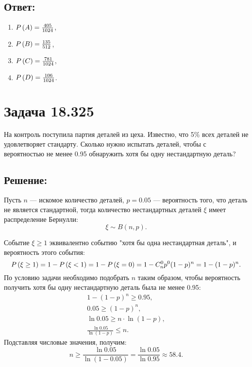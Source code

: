 \subsection*{Ответ:}
\begin{enumerate}
    \item $P \left ( A \right ) = \frac{405}{1024}$,
    \item $P \left ( B \right ) = \frac{135}{512}$,
    \item $P \left ( C \right ) = \frac{781}{1024}$,
    \item $P \left ( D \right ) = \frac{106}{1024}$.
\end{enumerate}

\section*{Задача 18.325}

На контроль поступила партия деталей из цеха. Известно, что 5\% всех деталей не удовлетворяет стандарту. Сколько нужно испытать деталей, чтобы с вероятностью не менее 0.95
обнаружить хотя бы одну нестандартную деталь?

\subsection*{Решение:}

Пусть $n$ --- искомое количество деталей, $p=0.05$ --- вероятность того, что деталь не является стандартной, тогда количество нестандартных деталей $\xi$ имеет распределение
Бернулли:
\begin{equation}
    \xi \sim B \left ( n, p \right ).
\end{equation}

Событие $\xi \ge 1$ эквивалентно событию "хотя бы одна нестандартная деталь"{}, и вероятность этого события:
\begin{equation}
    P \left ( \xi \ge 1 \right )
    = 1 - P \left ( \xi < 1 \right )
    = 1 - P \left ( \xi = 0 \right )
    = 1 - C_n^0 p^0 (1 - p)^n
    = 1 - (1 - p)^n .
\end{equation}
По условию задачи необходимо подобрать $n$ таким образом, чтобы вероятность получить хотя бы одну нестандартную деталь была не менее 0.95:
\begin{gather}
    1 - (1 - p)^n \ge 0.95 , \\
    0.05 \ge (1 - p)^n , \\
    \ln 0.05 \ge n \cdot \ln (1 - p), \\
    \frac{\ln 0.05}{\ln (1-p)} \le n .
\end{gather}
Подставляя числовые значения,  получим:
\begin{equation}
    n
    \ge \frac{\ln 0.05}{\ln (1-0.05)}
    = \frac{\ln 0.05}{\ln 0.95}
    \approx 58.4 .
\end{equation}

